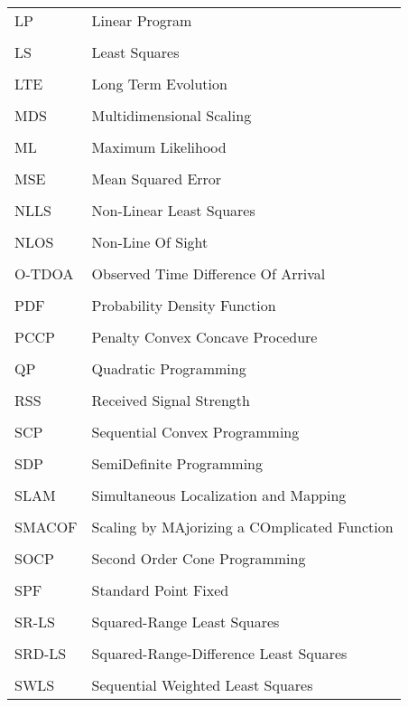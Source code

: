\begin{longtable}[h]{l l}
\\
LP & Linear Program \\
\\
LS & Least Squares \\
\\
LTE & Long Term Evolution \\
\\
MDS & Multidimensional Scaling \\ 
\\
ML & Maximum Likelihood \\
\\
MSE & Mean Squared Error\\
\\
NLLS & Non-Linear Least Squares \\
\\
NLOS & Non-Line Of Sight \\
\\
O-TDOA & Observed Time Difference Of Arrival\\
\\
PDF & Probability Density Function \\
\\
PCCP & Penalty Convex Concave Procedure \\
\\
QP & Quadratic Programming \\
\\
RSS & Received Signal Strength \\
\\
SCP & Sequential Convex Programming \\
\\
SDP & SemiDefinite Programming \\
\\
SLAM & Simultaneous Localization and Mapping  \\
\\
SMACOF & Scaling by MAjorizing a COmplicated Function \\
\\
SOCP & Second Order Cone Programming \\
\\
SPF & Standard  Point Fixed\\
\\
SR-LS  & Squared-Range Least Squares \\
\\
SRD-LS & Squared-Range-Difference Least Squares \\
\\
SWLS & Sequential Weighted Least Squares \\

\end{longtable}
